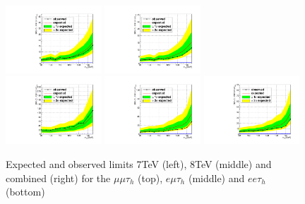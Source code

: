 \begin{figure}
\begin{center}
  \includegraphics[width=0.32\textwidth]{4_Analisys/pics/limits/emt/emt_8TeV.pdf}
  \includegraphics[width=0.32\textwidth]{4_Analisys/pics/limits/emt/emt.pdf} \\
  \includegraphics[width=0.32\textwidth]{4_Analisys/pics/limits/eet/eet_7TeV.pdf}
  \includegraphics[width=0.32\textwidth]{4_Analisys/pics/limits/eet/eet_8TeV.pdf}
  \includegraphics[width=0.32\textwidth]{4_Analisys/pics/limits/eet/eet.pdf} \\
  \caption{Expected and observed limits 7TeV (left), 8TeV (middle) and combined (right) for the $\mu\mu\tau_h$ (top), $e\mu\tau_h$ (middle) and $ee\tau_h$ (bottom)}
  \label{fig:llt_chan_limits}
\end{center}
\end{figure}

